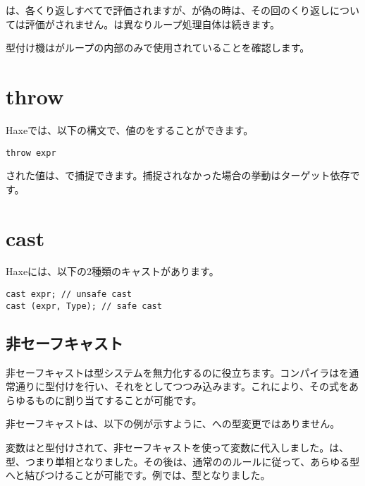 は、各くり返しすべてで評価されますが、が偽の時は、その回のくり返しについては評価がされません。は異なりループ処理自体は続きます。

型付け機はがループの内部のみで使用されていることを確認します。

\section{throw}
\label{expression-throw}

Haxeでは、以下の構文で、値のをすることができます。

\begin{lstlisting}
throw expr
\end{lstlisting}

された値は、で捕捉できます。捕捉されなかった場合の挙動はターゲット依存です。

\section{cast}
\label{expression-cast}

Haxeには、以下の2種類のキャストがあります。

\begin{lstlisting}
cast expr; // unsafe cast
cast (expr, Type); // safe cast
\end{lstlisting}

\subsection{非セーフキャスト}
\label{expression-cast-unsafe}

非セーフキャストは型システムを無力化するのに役立ちます。コンパイラはを通常通りに型付けを行い、それをとしてつつみ込みます。これにより、その式をあらゆるものに割り当てすることが可能です。

非セーフキャストは、以下の例が示すように、への型変更ではありません。


変数はと型付けされて、非セーフキャストを使って変数に代入しました。は、型、つまり単相となりました。その後は、通常ののルールに従って、あらゆる型へと結びつけることが可能です。例では、型となりました。

